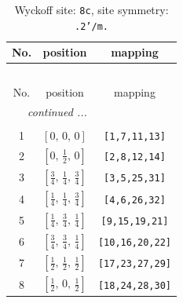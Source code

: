 \documentclass[fleqn,8pt]{jsarticle}
\begin{document}
\renewcommand{\arraystretch}{1.2}
\begin{longtable}{ccc}
\caption{Wyckoff site: {\tt 8c}, site symmetry: {\tt .2'/m.}}
 \\
 \hline \hline
No. & position & mapping \\ \hline \endfirsthead

\multicolumn{2}{l}{\tablename\ \thetable{}} \\
 \hline \hline
No. & position & mapping \\ \hline \endhead

 \hline \hline
\multicolumn{2}{r}{\footnotesize\it continued ...} \\ \endfoot

 \hline \hline
\multicolumn{2}{r}{} \\ \endlastfoot

1 & $\left[ 0,\, 0,\, 0 \right]$ & {\tt [1,7,11,13]} \\ \hline
2 & $\left[ 0,\, \frac{1}{2},\, 0 \right]$ & {\tt [2,8,12,14]} \\ \hline
3 & $\left[ \frac{3}{4},\, \frac{1}{4},\, \frac{3}{4} \right]$ & {\tt [3,5,25,31]} \\ \hline
4 & $\left[ \frac{1}{4},\, \frac{1}{4},\, \frac{3}{4} \right]$ & {\tt [4,6,26,32]} \\ \hline
5 & $\left[ \frac{1}{4},\, \frac{3}{4},\, \frac{1}{4} \right]$ & {\tt [9,15,19,21]} \\ \hline
6 & $\left[ \frac{3}{4},\, \frac{3}{4},\, \frac{1}{4} \right]$ & {\tt [10,16,20,22]} \\ \hline
7 & $\left[ \frac{1}{2},\, \frac{1}{2},\, \frac{1}{2} \right]$ & {\tt [17,23,27,29]} \\ \hline
8 & $\left[ \frac{1}{2},\, 0,\, \frac{1}{2} \right]$ & {\tt [18,24,28,30]} \\
\end{longtable}
\renewcommand{\arraystretch}{1.2}
\end{document}
